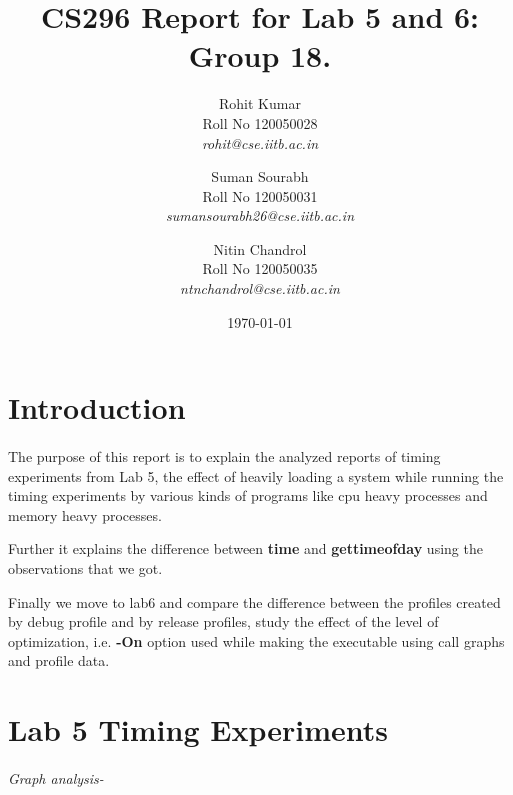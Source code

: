 \documentclass[11pt]{article}
\begin{document}
\title{CS296 Report for Lab 5 and 6:\\
		Group 18.}
	
\author{Rohit Kumar \\
		\textup{Roll No 120050028} \\
		\textit{rohit@cse.iitb.ac.in}
	\and
	Suman Sourabh \\
	\textup{Roll No 120050031} \\
	\textit{sumansourabh26@cse.iitb.ac.in}
	\and
	Nitin Chandrol\\
	\textup{Roll No 120050035} \\
	\textit{ntnchandrol@cse.iitb.ac.in}
	}

\date{\today}

\maketitle

\section{Introduction}

	\paragraph{}
	The purpose of this report is to explain the analyzed reports of timing experiments from Lab 5,
	 the effect of heavily loading a system while running the timing experiments 
	 by various kinds of programs like cpu heavy processes and memory heavy processes.
	 
	Further it explains the difference between \textbf{time} and \textbf{gettimeofday} using the observations that 
	we got.
	
	Finally we move to lab6 and compare the difference between the profiles created by debug profile 
	and by release profiles, study the effect of the level of optimization, i.e. \textbf{-On} option used while making the 
	executable using call graphs and profile data.

\section{Lab 5 Timing Experiments}
\paragraph{}
	
	\textit{Graph analysis-}
\end{document}
